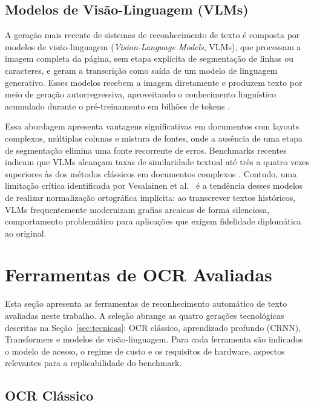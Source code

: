 \documentclass[
  12pt,
  oneside,
  a4paper,
  chapter=TITLE,
  section=TITLE,
  english,
  brazil
]{abntex2}
\begin{document}
\subsection{Modelos de Visão-Linguagem (VLMs)}

A geração mais recente de sistemas de reconhecimento de texto é composta por modelos de
visão-linguagem (\textit{Vision-Language Models}, VLMs), que processam a imagem completa
da página, sem etapa explícita de segmentação de linhas ou caracteres, e geram a
transcrição como saída de um modelo de linguagem generativo. Esses modelos recebem a
imagem diretamente e produzem texto por meio de geração autorregressiva, aproveitando o
conhecimento linguístico acumulado durante o pré-treinamento em bilhões de
tokens \cite{dataunboxed2025}.

Essa abordagem apresenta vantagens significativas em documentos com layouts complexos,
múltiplas colunas e mistura de fontes, onde a ausência de uma etapa de segmentação
elimina uma fonte recorrente de erros. Benchmarks recentes indicam que VLMs alcançam
taxas de similaridade textual até três a quatro vezes superiores às dos métodos clássicos
em documentos complexos \cite{dataunboxed2025}. Contudo, uma limitação crítica
identificada por Vesalainen et al.\ \cite{vesalainen2025} é a tendência desses modelos
de realizar normalização ortográfica implícita: ao transcrever textos históricos, VLMs
frequentemente modernizam grafias arcaicas de forma silenciosa, comportamento
problemático para aplicações que exigem fidelidade diplomática ao original.

\clearpage
\section{Ferramentas de OCR Avaliadas}
\label{sec:ferramentas}

Esta seção apresenta as ferramentas de reconhecimento automático de texto avaliadas neste
trabalho. A seleção abrange as quatro gerações tecnológicas descritas na
Seção~\ref{sec:tecnicas}: OCR clássico, aprendizado profundo (CRNN), Transformers e
modelos de visão-linguagem. Para cada ferramenta são indicados o modelo de acesso, o
regime de custo e os requisitos de hardware, aspectos relevantes para a replicabilidade
do benchmark.

\subsection{OCR Clássico}
\end{document}
